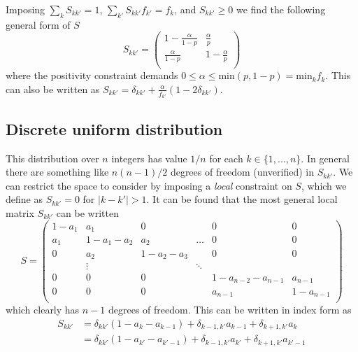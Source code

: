\documentclass{article}
\begin{document}
Imposing $\sum_{k} S_{k k'} = 1$, $\sum_{k'} S_{k k'} f_{k'} = f_k$, and $S_{k k'} \geq 0$ we find the following general form of $S$
\begin{equation}
  S_{k k'} = \begin{pmatrix}
    1 - \frac{\alpha}{1-p} & \frac{\alpha}{p} \\
    \frac{\alpha}{1-p} & 1 - \frac{\alpha}{p} \\
  \end{pmatrix}
  \label{eq:bernoulli_trans}
\end{equation}
where the positivity constraint demands $0 \leq \alpha \leq \textrm{min}(p,
1-p) = \textrm{min}_k f_k$. This can also be written as $S_{k k'} = \delta_{k k'} +
\frac{\alpha}{f_{k'}} \left(1 - 2\delta_{kk'}\right)$.

\subsection{Discrete uniform distribution}
This distribution over $n$ integers has value $1/n$ for each $k\in\{1, ...,
n\}$. In general there are something like $n (n-1)/2$ degrees of freedom
(unverified) in $S_{k k'}$. We can restrict the space to consider by imposing a
\emph{local} constraint on $S$, which we define as $S_{k k'} = 0$ for $|k - k'|
> 1$. It can be found that the most general local matrix $S_{k
k'}$ can be written
\begin{equation}
  S = \begin{pmatrix}
    1 - a_1 & a_1 & 0 &  & 0 & 0\\
    a_1 & 1 - a_1 - a_2 & a_2 & \hdots & 0 & 0\\
    0 & a_2 & 1 - a_2 - a_3 & & 0 & 0 \\
      & \vdots & & \ddots \\
     0 & 0 & 0 & & 1 - a_{n-2} - a_{n-1} & a_{n-1} \\
     0 & 0 & 0 & & a_{n-1} & 1 - a_{n-1} \\
  \end{pmatrix}
  \label{eq:discrete_uni_trans}
\end{equation}
which clearly has $n-1$ degrees of freedom. This can be written in index form as
\begin{align}
  S_{kk'} &= \delta_{kk'}(1 - a_k - a_{k-1}) + \delta_{k-1,k'}a_{k-1} + \delta_{k+1,k'}a_k \\
          &=  \delta_{kk'}(1 - a_{k'} - a_{k'-1}) + \delta_{k-1,k'}a_{k'} + \delta_{k+1,k'}a_{k'-1}
  \label{eq:discrete_uni_trans_idx}
\end{align}
\end{document}

